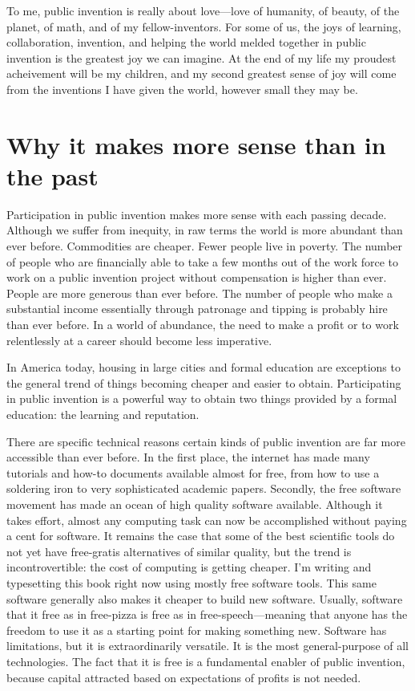\documentclass[
	fontsize=10pt, %
	twoside=false, %
	secnumdepth=1, %
]{kaobook}
\begin{document}
To me, public invention is really about love---love of humanity,
of beauty, of the planet, of math, and of my fellow-inventors.
For some of us, the joys of learning, collaboration, invention,
and helping the world melded together in public invention
is the greatest joy we can imagine.
At the end of my life my proudest acheivement will be my children,
and my second greatest sense of joy will come from the
inventions I have given the world, however small they may be.

\chapter{Why it makes more sense than in the past}

Participation in public invention makes more sense with
each passing decade.
Although we suffer from inequity, in raw terms the world
is more abundant than ever before.
Commodities are cheaper.
Fewer people live in poverty.
The number of people who are financially able to take
a few months out of the work force to work on a public invention
project without compensation is higher than ever.
People are more generous than ever before.
The number of people who make a substantial income
essentially through patronage and tipping is probably
hire than ever before.
In a world of abundance, the need to make a profit
or to work relentlessly at a career should
become less imperative.

In America today, housing in large cities
and formal education are exceptions
to the general trend of things becoming cheaper and easier to obtain.
Participating in public invention is a powerful way to
obtain two things provided by a formal education:
the learning and reputation.

There are specific technical reasons certain kinds of
public invention are far more accessible than ever before.
In the first place, the internet has made many tutorials
and how-to documents available almost for free, from
how to use a soldering iron to very sophisticated academic
papers.
Secondly, the free software movement has made an ocean
of high quality software available.
Although it takes effort, almost any computing task can
now be accomplished without paying a cent for software.
It remains the case that some of the best scientific tools
do not yet have free-gratis alternatives of similar quality,
but the trend is incontrovertible: the cost of computing
is getting cheaper.
I'm writing and typesetting this book right now
using mostly free software tools.
This same software generally also makes it cheaper to
build new software.
Usually, software that it free
as in free-pizza is free as in free-speech---meaning that
anyone has the freedom to use it as a starting point for making
something new.
Software has limitations, but it is extraordinarily versatile.
It is the most general-purpose of all technologies. The fact
that it is free is a fundamental enabler of public invention,
because capital attracted based on expectations of profits is
not needed.
\end{document}
